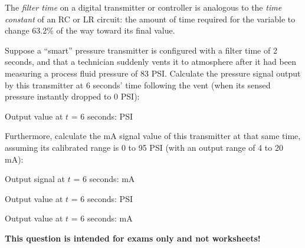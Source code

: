 

The {\it filter time} on a digital transmitter or controller is analogous to the {\it time constant} of an RC or LR circuit: the amount of time required for the variable to change 63.2\% of the way toward its final value.

\vskip 10pt

Suppose a ``smart'' pressure transmitter is configured with a filter time of 2 seconds, and that a technician suddenly vents it to atmosphere after it had been measuring a process fluid pressure of 83 PSI.  Calculate the pressure signal output by this transmitter at 6 seconds' time following the vent (when its sensed pressure instantly dropped to 0 PSI):

\vskip 10pt

Output value at $t$ = 6 seconds: \underbar{\hskip 50pt} PSI

\vskip 10pt

Furthermore, calculate the mA signal value of this transmitter at that same time, assuming its calibrated range is 0 to 95 PSI (with an output range of 4 to 20 mA):

\vskip 10pt

Output signal at $t$ = 6 seconds: \underbar{\hskip 50pt} mA







Output value at $t$ = 6 seconds:  PSI

\vskip 10pt

Output value at $t$ = 6 seconds:  mA







{\bf This question is intended for exams only and not worksheets!}



